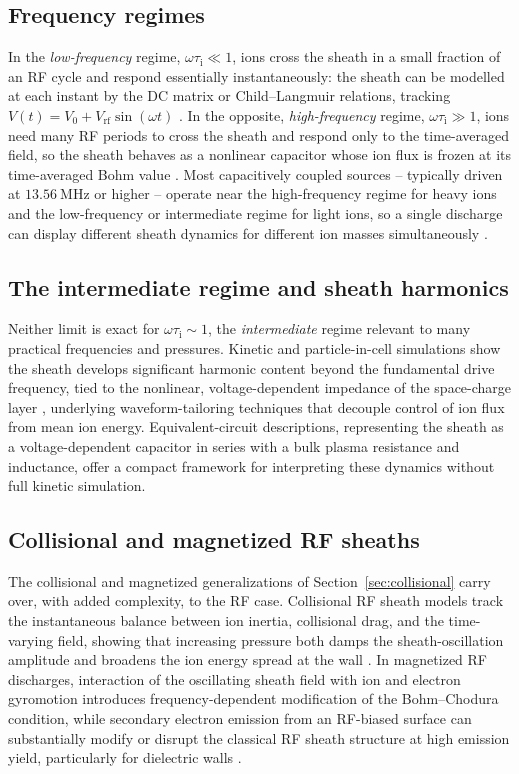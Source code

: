 \subsection{Frequency regimes}

In the \emph{low-frequency} regime, $\omega \tau_{\mathrm{i}} \ll 1$, ions cross the sheath in a small fraction of an RF cycle and respond essentially instantaneously: the sheath can be modelled at each instant by the DC matrix or Child--Langmuir relations, tracking $V(t) = V_{0} + V_{\mathrm{rf}} \sin(\omega t)$ \cite{ref0043}. In the opposite, \emph{high-frequency} regime, $\omega \tau_{\mathrm{i}} \gg 1$, ions need many RF periods to cross the sheath and respond only to the time-averaged field, so the sheath behaves as a nonlinear capacitor whose ion flux is frozen at its time-averaged Bohm value \cite{ref0043}. Most capacitively coupled sources -- typically driven at $\SI{13.56}{\mega\hertz}$ or higher -- operate near the high-frequency regime for heavy ions and the low-frequency or intermediate regime for light ions, so a single discharge can display different sheath dynamics for different ion masses simultaneously \cite{ref0038,ref0040}.

\subsection{The intermediate regime and sheath harmonics}

Neither limit is exact for $\omega \tau_{\mathrm{i}} \sim 1$, the \emph{intermediate} regime relevant to many practical frequencies and pressures. Kinetic and particle-in-cell simulations show the sheath develops significant harmonic content beyond the fundamental drive frequency, tied to the nonlinear, voltage-dependent impedance of the space-charge layer \cite{ref0040,ref0043}, underlying waveform-tailoring techniques that decouple control of ion flux from mean ion energy. Equivalent-circuit descriptions, representing the sheath as a voltage-dependent capacitor in series with a bulk plasma resistance and inductance, offer a compact framework for interpreting these dynamics without full kinetic simulation.

\subsection{Collisional and magnetized RF sheaths}

The collisional and magnetized generalizations of Section~\ref{sec:collisional} carry over, with added complexity, to the RF case. Collisional RF sheath models track the instantaneous balance between ion inertia, collisional drag, and the time-varying field, showing that increasing pressure both damps the sheath-oscillation amplitude and broadens the ion energy spread at the wall \cite{ref0043}. In magnetized RF discharges, interaction of the oscillating sheath field with ion and electron gyromotion introduces frequency-dependent modification of the Bohm--Chodura condition, while secondary electron emission from an RF-biased surface can substantially modify or disrupt the classical RF sheath structure at high emission yield, particularly for dielectric walls \cite{ref0038}.

